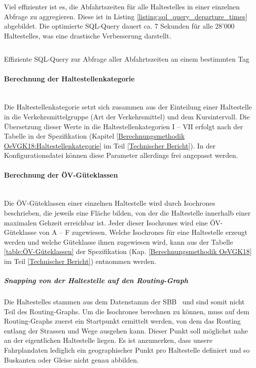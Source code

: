 Viel effizienter ist es, die Abfahrtszeiten für alle \glspl{Haltestelle} in einer einzelnen Abfrage zu aggregieren.
Diese ist in Listing \ref{listing:sql_query_departure_times} abgebildet.
Die optimierte SQL-Query dauert ca. 7 Sekunden für alle 28'000 \glspl{Haltestelle}, was eine drastische Verbesserung darstellt.

\begin{listing}[ht]
    \inputminted{sql}{projectdoc/listing/departure_time_cte.sql}
    \caption{Effiziente SQL-Query zur Abfrage aller Abfahrtszeiten an einem bestimmten Tag}
    \label{listing:sql_query_departure_times}
\end{listing}

\paragraph{Berechnung der Haltestellenkategorie}~\\
Die Haltestellenkategorie setzt sich zusammen aus der Einteilung einer \gls{Haltestelle} in die Verkehrsmittelgruppe (Art der Verkehrsmittel) und dem Kursintervall.
Die Übersetzung dieser Werte in die Haltestellenkategorien  I -- VII erfolgt nach der Tabelle in der Spezifikation (Kapitel \ref{Berechnungsmethodik OeVGK18:Haltestellenkategorie} im Teil \ref{Technischer Bericht}).
In der Konfigurationsdatei können diese Parameter allerdings frei angepasst werden.

\paragraph{Berechnung der ÖV-Güteklassen}~\\
Die \gls{ÖV-Güteklassen} einer einzelnen \gls{Haltestelle} wird durch \glspl{Isochrone} beschrieben, die jeweils eine Fläche bilden, von der die \gls{Haltestelle} innerhalb einer maximalen Gehzeit erreichbar ist.
Jeder dieser \glspl{Isochrone} wird eine \acs{ÖV}-Güteklasse von A -- F zugewiesen.
Welche \glspl{Isochrone} für eine \gls{Haltestelle} erzeugt werden und welche Güteklasse ihnen zugewiesen wird, kann aus der Tabelle \ref{table:ÖV-Güteklassen} der Spezifikation (Kap. \ref{Berechnungsmethodik OeVGK18} im Teil \ref{Technischer Bericht}) entnommen werden.

\subparagraph{Snapping von der Haltestelle auf den Routing-Graph}
Die \glspl{Haltestelle} stammen aus dem Datenstamm der SBB~\cite{sbb_hafas_spec} und sind somit nicht Teil des \glspl{Routing-Graph}. 
Um die \glspl{Isochrone} berechnen zu können, muss auf dem \glspl{Routing-Graph} zuerst ein Startpunkt ermittelt werden, von dem das Routing entlang der Strassen und Wege ausgehen kann.
Dieser Punkt soll möglichst nahe an der eigentlichen \gls{Haltestelle} liegen.
Es ist anzumerken, dass unsere Fahrplandaten lediglich ein geographischer Punkt pro \gls{Haltestelle} definiert und so Buskanten oder Gleise nicht genau abbilden.

